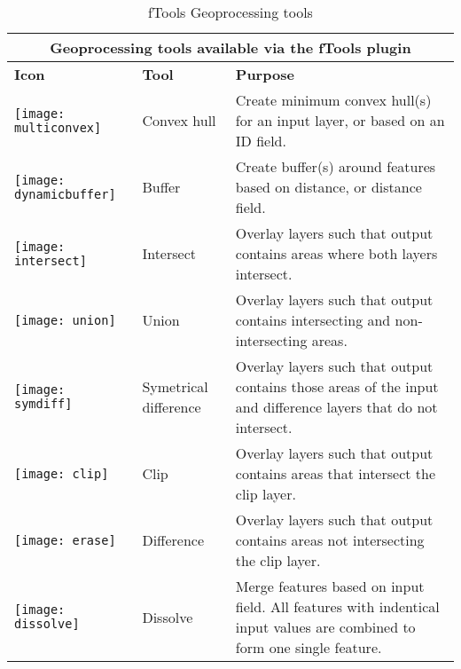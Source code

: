 \begin{table}[ht]
\centering
\caption{fTools Geoprocessing tools}\label{tab:ftool_geoprocessing}\medskip
 \begin{tabular}{|p{0.3in}|p{0.8in}|p{5.1in}|}
 \hline \multicolumn{3}{|c|}{\textbf{Geoprocessing tools available via the fTools plugin}} \\
 \hline \textbf{Icon} & \textbf{Tool} & \textbf{Purpose} \\
 \hline \texttt{[image: multiconvex]} & Convex hull & Create 
minimum convex hull(s) for an input layer, or based on an ID field. \\
 \hline \texttt{[image: dynamicbuffer]} & Buffer & Create 
buffer(s) around features based on distance, or distance field. \\
 \hline \texttt{[image: intersect]} & Intersect & Overlay 
layers such that output contains areas where both layers intersect. \\
 \hline \texttt{[image: union]} & Union & Overlay layers such 
that output contains intersecting and non-intersecting areas. \\
 \hline \texttt{[image: symdiff]} & Symetrical difference & 
Overlay layers such that output contains those areas of the input and 
difference layers that do not intersect. \\
 \hline \texttt{[image: clip]} & Clip & Overlay layers such 
that output contains areas that intersect the clip layer. \\
 \hline \texttt{[image: erase]} & Difference & Overlay layers 
such that output contains areas not intersecting the clip layer. \\
 \hline \texttt{[image: dissolve]} & Dissolve & Merge features 
based on input field. All features with indentical input values are combined 
to form one single feature. \\
 \hline
\end{tabular}
\end{table}

